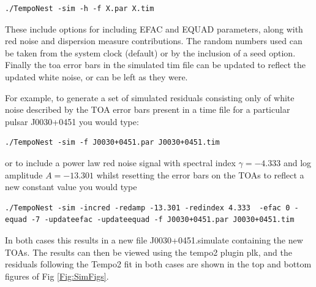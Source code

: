 \documentclass[%
 preprint,
 amsmath,amssymb,amsfonts,
 aps,
]{revtex4-1}
\begin{document}
\begin{lstlisting}
./TempoNest -sim -h -f X.par X.tim
\end{lstlisting}

These include options for including EFAC and EQUAD parameters, along with red noise and dispersion measure contributions.  The random numbers used can be taken from the system clock (default) or by the inclusion of a seed option.  Finally the toa error bars in the simulated tim file can be updated to reflect the updated white noise, or can be left as they were.  

For example, to generate a set of simulated residuals consisting only of white noise described by the TOA error bars present in a time file for a particular pulsar J0030+0451 you would type:

\begin{lstlisting}
./TempoNest -sim -f J0030+0451.par J0030+0451.tim
\end{lstlisting}
%
or to include a power law red noise signal with spectral index $\gamma = -4.333$ and log amplitude $A=-13.301$ whilst resetting the error bars on the TOAs to reflect a new constant value you would type

\begin{lstlisting}
./TempoNest -sim -incred -redamp -13.301 -redindex 4.333  -efac 0 -equad -7 -updateefac -updateequad -f J0030+0451.par J0030+0451.tim
\end{lstlisting}

In both cases this results in a new file J0030+0451.simulate containing the new TOAs.  The results can then be viewed using the tempo2 plugin plk, and the residuals following the Tempo2 fit in both cases are shown in the top and bottom figures of Fig \ref{Fig:SimFigs}.
\end{document}
